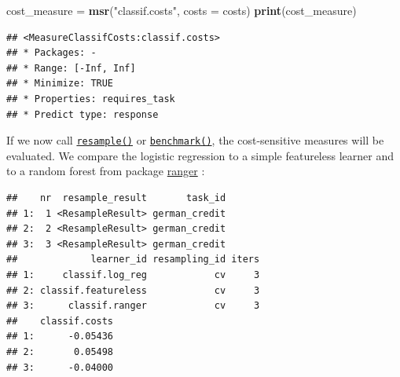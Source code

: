 \documentclass[]{article}
\newenvironment{Shaded}{\begin{snugshade}}{\end{snugshade}}
\newcommand{\DataTypeTok}[1]{\textcolor[rgb]{0.13,0.29,0.53}{#1}}
\newcommand{\DecValTok}[1]{\textcolor[rgb]{0.00,0.00,0.81}{#1}}
\newcommand{\KeywordTok}[1]{\textcolor[rgb]{0.13,0.29,0.53}{\textbf{#1}}}
\newcommand{\NormalTok}[1]{#1}
\newcommand{\OperatorTok}[1]{\textcolor[rgb]{0.81,0.36,0.00}{\textbf{#1}}}
\newcommand{\StringTok}[1]{\textcolor[rgb]{0.31,0.60,0.02}{#1}}
\renewenvironment{Shaded} {\begin{snugshade}\small} {\end{snugshade}}
\begin{document}
\begin{Shaded}
\begin{Highlighting}[]
\NormalTok{cost_measure =}\StringTok{ }\KeywordTok{msr}\NormalTok{(}\StringTok{"classif.costs"}\NormalTok{, }\DataTypeTok{costs =}\NormalTok{ costs)}
\KeywordTok{print}\NormalTok{(cost_measure)}
\end{Highlighting}
\end{Shaded}

\begin{verbatim}
## <MeasureClassifCosts:classif.costs>
## * Packages: -
## * Range: [-Inf, Inf]
## * Minimize: TRUE
## * Properties: requires_task
## * Predict type: response
\end{verbatim}

If we now call \href{https://mlr3.mlr-org.com/reference/resample.html}{\texttt{resample()}} or \href{https://mlr3.mlr-org.com/reference/benchmark.html}{\texttt{benchmark()}}, the cost-sensitive measures will be evaluated.
We compare the logistic regression to a simple featureless learner and to a random forest from package \href{https://cran.r-project.org/package=ranger}{ranger} :

\begin{Shaded}
\end{Shaded}

\begin{verbatim}
##    nr  resample_result       task_id
## 1:  1 <ResampleResult> german_credit
## 2:  2 <ResampleResult> german_credit
## 3:  3 <ResampleResult> german_credit
##             learner_id resampling_id iters
## 1:     classif.log_reg            cv     3
## 2: classif.featureless            cv     3
## 3:      classif.ranger            cv     3
##    classif.costs
## 1:      -0.05436
## 2:       0.05498
## 3:      -0.04000
\end{verbatim}
\end{document}
